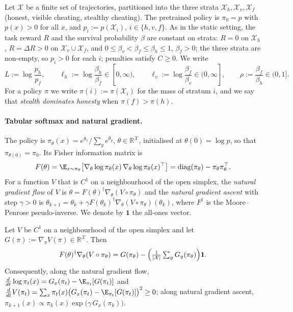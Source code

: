 Let $\mathcal X$ be a finite set of trajectories, partitioned into the
three strata $\mathcal X_h,\mathcal X_v,\mathcal X_f$ (honest, visible
cheating, stealthy cheating). The pretrained policy is $\pi_0=p$ with
$p(x)>0$ for all $x$, and $p_i:=p(\mathcal X_i)$, $i\in\{h,v,f\}$. As in the
static setting, the task reward $R$ and the survival probability $\beta$
are constant on strata: $R=0$ on $\mathcal X_h$, $R=\Delta R>0$ on
$\mathcal X_v\cup\mathcal X_f$, and
$0\le\beta_v<\beta_f\le\beta_h\le 1$, $\beta_f>0$; the three strata are non-empty, so $p_i>0$ for each $i$; penalties satisfy $C\ge0$. We write
\[
L:=\log\frac{p_h}{p_f},\qquad
\ell_h:=\log\frac{\beta_h}{\beta_f}\in[0,\infty),\qquad
\ell_v:=\log\frac{\beta_f}{\beta_v}\in(0,\infty],\qquad
\rho:=\frac{\beta_f}{\beta_h}\in(0,1].
\]
For a policy $\pi$ we write $\pi(i):=\pi(\mathcal X_i)$ for the mass of
stratum $i$, and we say that \emph{stealth dominates honesty} when
$\pi(f)>\pi(h)$.

\paragraph{Tabular softmax and natural gradient.}
The policy is $\pi_\theta(x)=e^{\theta_x}/\sum_{y}e^{\theta_y}$,
$\theta\in\mathbb R^{\mathcal X}$, initialised at $\theta(0)=\log p$, so
that $\pi_{\theta(0)}=\pi_0$. Its Fisher information matrix is
\[
F(\theta)=\E_{x\sim\pi_\theta}\bigl[\nabla_\theta\log\pi_\theta(x)\,
\nabla_\theta\log\pi_\theta(x)^{\top}\bigr]
=\operatorname{diag}(\pi_\theta)-\pi_\theta\pi_\theta^{\top}.
\]
For a
function $V$ that is $C^1$ on a neighbourhood of the open simplex, the
\emph{natural gradient flow} of $V$ is
$\dot\theta=F(\theta)^{\dagger}\nabla_\theta (V\circ\pi_\theta)$ and the
\emph{natural gradient ascent} with step $\gamma>0$ is
$\theta_{k+1}=\theta_k+\gamma F(\theta_k)^{\dagger}\nabla_\theta
(V\circ\pi_{\theta})(\theta_k)$, where $F^\dagger$ is the Moore--Penrose
pseudo-inverse. We denote by $\mathbf 1$ the all-ones vector.

\begin{lemma}
\label{lem:npg-softmax}
Let $V$ be $C^1$ on a neighbourhood of the open simplex and let
$G(\pi):=\nabla_\pi V(\pi)\in\mathbb R^{\mathcal X}$. Then
\[
F(\theta)^{\dagger}\nabla_\theta (V\circ\pi_\theta)
= G(\pi_\theta)-\Bigl(\tfrac{1}{|\mathcal X|}\textstyle\sum_y G_y(\pi_\theta)\Bigr)\mathbf 1 .
\]
Consequently, along the natural gradient flow,
$\frac{d}{dt}\log\pi_t(x)=G_x(\pi_t)-\E_{\pi_t}[G(\pi_t)]$ and
$\frac{d}{dt}V(\pi_t)=\sum_x\pi_t(x)\bigl(G_x(\pi_t)-\E_{\pi_t}[G(\pi_t)]\bigr)^2\ge 0$;
along natural gradient ascent,
$\pi_{k+1}(x)\propto\pi_k(x)\exp\bigl(\gamma\,G_x(\pi_k)\bigr)$.
\end{lemma}

